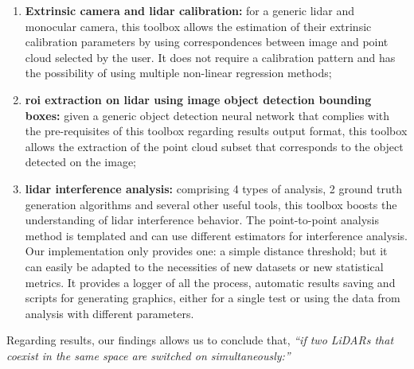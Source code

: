 \begin{enumerate}
	\item \textbf{Extrinsic camera and \ac{lidar} calibration:} for a generic \ac{lidar} and monocular camera, this toolbox allows the estimation of their extrinsic calibration parameters by using correspondences between image and point cloud selected by the user. It does not require a calibration pattern and has the possibility of using multiple non-linear regression methods;
	\item \textbf{\ac{roi} extraction on \ac{lidar} using image object detection bounding boxes:} given a generic object detection neural network that complies with the pre-requisites of this toolbox regarding results output format, this toolbox allows the extraction of the point cloud subset that corresponds to the object detected on the image;  
	\item \textbf{\ac{lidar} interference analysis:} comprising 4 types of analysis, 2 ground truth generation algorithms and several other useful tools, this toolbox boosts the understanding of \ac{lidar} interference behavior. The point-to-point analysis method is templated and can use different estimators for interference analysis. Our implementation only provides one: a simple distance threshold; but it can easily be adapted to the necessities of new datasets or new statistical metrics. It provides a logger of all the process, automatic results saving and scripts for generating graphics, either for a single test or using the data from  analysis with different parameters.
\end{enumerate}

Regarding results, our findings allows us to conclude that, \textit{``if two LiDARs that coexist in the same space are switched on simultaneously:''}


